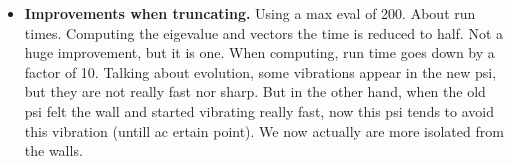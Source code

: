 \documentclass{article}
\begin{document}
\begin{itemize}
	\item \textbf{Improvements when truncating.} Using a max eval of 200. About run times. Computing the eigevalue and vectors the time is reduced to half. Not a huge improvement, but it is one. When computing, run time goes down by a factor of 10. Talking about evolution, some vibrations appear in the new psi, but they are not really fast nor sharp. But in the other hand, when the old psi felt the wall and started vibrating really fast, now this psi tends to avoid this vibration (untill ac ertain point). We now actually are more isolated from the walls. 
\end{itemize}
\end{document}
